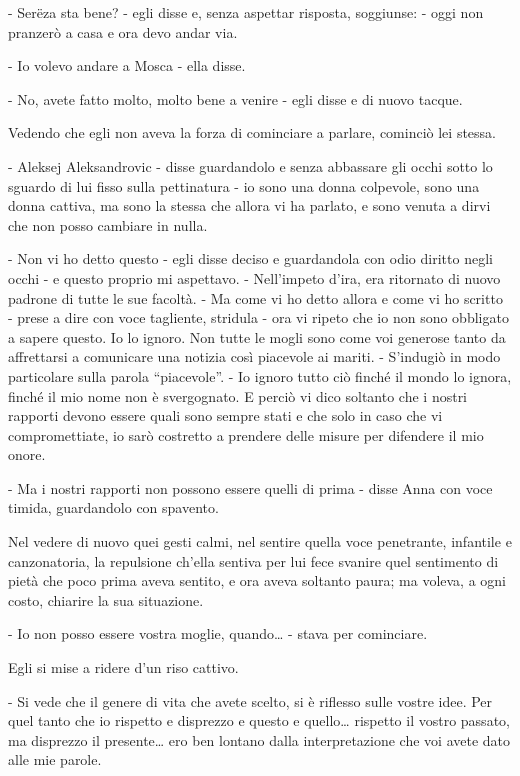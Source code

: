 - Serëza sta bene? - egli disse e, senza aspettar risposta, soggiunse: - oggi non pranzerò a casa e ora devo andar via. 

- Io volevo andare a Mosca - ella disse. 

- No, avete fatto molto, molto bene a venire - egli disse e di nuovo tacque. 

Vedendo che egli non aveva la forza di cominciare a parlare, cominciò lei stessa. 

- Aleksej Aleksandrovic - disse guardandolo e senza abbassare gli occhi sotto lo sguardo di lui fisso sulla pettinatura - io sono una donna colpevole, sono una donna cattiva, ma sono la stessa che allora vi ha parlato, e sono venuta a dirvi che non posso cambiare in nulla. 

- Non vi ho detto questo - egli disse deciso e guardandola con odio diritto negli occhi - e questo proprio mi aspettavo. - Nell'impeto d'ira, era ritornato di nuovo padrone di tutte le sue facoltà. - Ma come vi ho detto allora e come vi ho scritto - prese a dire con voce tagliente, stridula - ora vi ripeto che io non sono obbligato a sapere questo. Io lo ignoro. Non tutte le mogli sono come voi generose tanto da affrettarsi a comunicare una notizia così piacevole ai mariti. - S'indugiò in modo particolare sulla parola ``piacevole''. - Io ignoro tutto ciò finché il mondo lo ignora, finché il mio nome non è svergognato. E perciò vi dico soltanto che i nostri rapporti devono essere quali sono sempre stati e che solo in caso che vi compromettiate, io sarò costretto a prendere delle misure per difendere il mio onore. 

- Ma i nostri rapporti non possono essere quelli di prima - disse Anna con voce timida, guardandolo con spavento. 

Nel vedere di nuovo quei gesti calmi, nel sentire quella voce penetrante, infantile e canzonatoria, la repulsione ch'ella sentiva per lui fece svanire quel sentimento di pietà che poco prima aveva sentito, e ora aveva soltanto paura; ma voleva, a ogni costo, chiarire la sua situazione. 

- Io non posso essere vostra moglie, quando\ldots{} - stava per cominciare. 

Egli si mise a ridere d'un riso cattivo. 

- Si vede che il genere di vita che avete scelto, si è riflesso sulle vostre idee. Per quel tanto che io rispetto e disprezzo e questo e quello\ldots{} rispetto il vostro passato, ma disprezzo il presente\ldots{} ero ben lontano dalla interpretazione che voi avete dato alle mie parole. 

